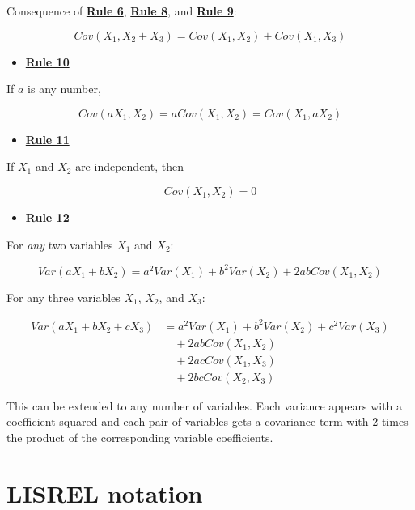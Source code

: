 \documentclass[
]{book}
\providecommand{\tightlist}{%
  \setlength{\itemsep}{0pt}\setlength{\parskip}{0pt}}
\begin{document}
Consequence of \href{./covariance.html\#Rule6}{\textbf{Rule 6}}, \href{./covariance.html\#Rule8}{\textbf{Rule 8}}, and \href{./covariance.html\#Rule9}{\textbf{Rule 9}}:

\[
Cov\left(X_{1}, X_{2} \pm X_{3}\right) = Cov\left(X_{1}, X_{2}\right) \pm Cov\left(X_{1}, X_{3}\right)  
\]

\begin{itemize}
\tightlist
\item
  \href{./covariance.html\#Rule10}{\textbf{Rule 10}}
\end{itemize}

If \(a\) is any number,

\[
Cov\left(a X_{1}, X_{2}\right) = a Cov\left(X_{1}, X_{2}\right) =  Cov\left(X_{1}, a X_{2}\right)  
\]

\begin{itemize}
\tightlist
\item
  \href{./covariance.html\#Rule11}{\textbf{Rule 11}}
\end{itemize}

If \(X_{1}\) and \(X_{2}\) are independent, then

\[
Cov\left(X_{1}, X_{2}\right) = 0
\]

\begin{itemize}
\tightlist
\item
  \href{./covariance.html\#Rule12}{\textbf{Rule 12}}
\end{itemize}

For \emph{any} two variables \(X_{1}\) and \(X_{2}\):

\[
Var(aX_{1} + bX_{2}) = 
    a^2Var(X_{1}) + b^2Var(X_{2}) + 2abCov(X_{1}, X_{2})
\]

For any three variables \(X_{1}\), \(X_{2}\), and \(X_{3}\):

\begin{align}
Var(aX_{1} + bX_{2} + cX_{3}) &= 
    a^2Var(X_{1}) + b^2Var(X_{2}) + c^2Var(X_{3}) \\
    & \quad + 2abCov(X_{1}, X_{2}) \\
    & \quad + 2acCov(X_{1}, X_{3}) \\
    & \quad + 2bcCov(X_{2}, X_{3})
\end{align}

This can be extended to any number of variables. Each variance appears with a coefficient squared and each pair of variables gets a covariance term with 2 times the product of the corresponding variable coefficients.

\hypertarget{appendix-lisrel}{%
\chapter{LISREL notation}\label{appendix-lisrel}}

  
\end{document}
